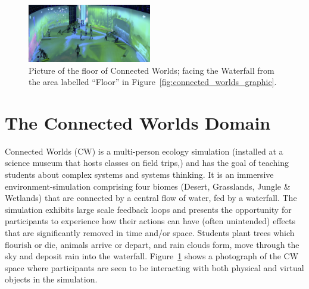 \documentclass[letterpaper]{article} %
\newcommand{\citename}[1]{\citeauthor{#1}~\shortcite{#1}}
\begin{document}









\begin{figure}[t]
\centering
\includegraphics[width=0.48\textwidth]{./images/cw_viz2.png}
\caption{Picture of the floor of Connected Worlds; facing the Waterfall from the area labelled ``Floor'' in Figure~\ref{fig:connected_worlds_graphic}.}
\label{fig:connected_worlds_viz}
\end{figure}


\section{The Connected Worlds Domain}
\label{sec:cw_desc}
Connected Worlds (CW) is a multi-person ecology simulation (installed at a science museum that hosts classes on field trips,) and has the goal of teaching students about complex systems and systems thinking.
It is an immersive environment-simulation comprising four biomes (Desert, Grasslands, Jungle \& Wetlands) that are connected by a central flow of water, fed by a waterfall. The simulation exhibits large scale feedback loops and presents the opportunity for participants to experience how their actions can have (often unintended) effects that are significantly removed in time and/or space. Students plant trees which flourish or die, animals arrive or depart, and rain clouds form, move through the sky and deposit rain into the waterfall.
Figure~\ref{fig:connected_worlds_viz} shows a photograph of the CW space where participants are seen to be interacting with both physical and virtual objects in the simulation.
\end{document}
